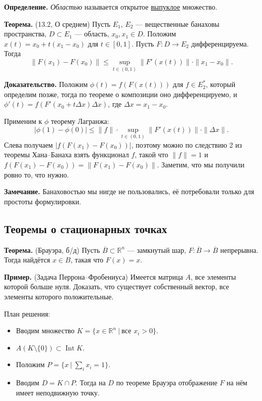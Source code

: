 \QED

\textbf{Определение.} \textit{Областью} называется открытое \underline{выпуклое} множество.

\textbf{Теорема.} (13.2, О среднем) Пусть $E_1$, $E_2$ --- вещественные банаховы пространства, $D \subset E_1$ --- область, $x_0, x_1 \in D$.
Положим $x(t) = x_0 + t(x_1 - x_0)$ для $t \in [0, 1]$.
Пусть $F: D \to E_2$ дифференцируема.
Тогда
\[
    \|F(x_1) - F(x_0)\| \le \sup_{t \in (0, 1)} \|F'(x(t))\| \cdot \|x_1 - x_0\|.
\]

\textbf{Доказательство.} Положим $\phi(t) = f(F(x(t)))$ для $f \in E_2^*$, который определим позже, тогда по теореме о композиции оно дифференцируемо, и $\phi'(t) = f(F'(x_0 + t \Delta x) \Delta x)$, где $\Delta x = x_1 - x_0$.

Применим к $\phi$ теорему Лагранжа:
\[
    |\phi(1) - \phi(0)| \le \|f\| \cdot \sup_{t \in (0, 1)} \|F'(x(t))\| \cdot \|\Delta x\|.
\]
Слева получаем $|f(F(x_1) - F(x_0))|$, поэтому можно по следствию 2 из теоремы Хана--Банаха взять функционал $f$, такой что $\|f\| = 1$ и $f(F(x_1) - F(x_0)) = \|F(x_1) - F(x_0)\|$.
Заметим, что мы получили ровно то, что нужно.

\QED

\textbf{Замечание.} Банаховостью мы нигде не пользовались, её потребовали только для простоты формулировки.

\subsection{Теоремы о стационарных точках}
\textbf{Теорема.} (Брауэра, б/д) Пусть $\overline B \subset \mathbb R^n$ --- замкнутый шар, $F: \overline B \to \overline B$ непрерывна.
Тогда найдётся $x \in B$, такая что $F(x) = x$.

\textbf{Пример.} (Задача Перрона--Фробениуса)
Имеется матрица $A$, все элементы которой больше нуля.
Доказать, что существует собственный вектор, все элементы которого положительные.

План решения:
\begin{itemize}
    \item Вводим множество $K = \{x \in \mathbb R^n~|~\text{все $x_i > 0$}\}$.
    \item $A(K \setminus \{0\}) \subset \operatorname{Int} K$.
    \item Положим $P = \{x~|~\sum_{i} x_i = 1\}$.
    \item Вводим $D = K \cap P$.
        Тогда на $D$ по теореме Брауэра отображение $F$ на нём имеет неподвижную точку.
\end{itemize}

